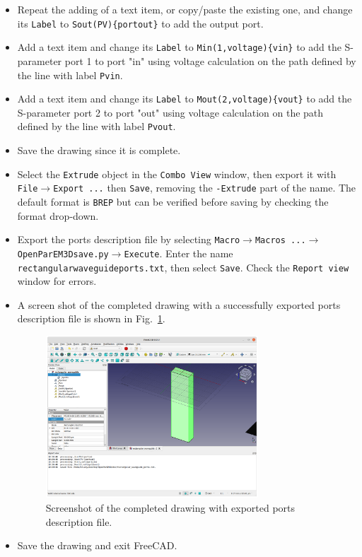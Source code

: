\documentclass[titlepage]{article}
\renewcommand\_{\textunderscore\linebreak[1]}
\begin{document}
\begin{itemize}
\item Repeat the adding of a text item, or copy/paste the existing one, and change its \texttt{Label} to \newline \texttt{\_Sout(PV)\{portout\}} to add the output port.
\item Add a text item and change its \texttt{Label} to \texttt{\_Min(1,voltage)\{vin\}} to add the S-parameter port 1 to port "in" using voltage calculation on the path defined by the line with label \texttt{\_Pvin}.
\item Add a text item and change its \texttt{Label} to \texttt{\_Mout(2,voltage)\{vout\}} to add the S-parameter port 2 to port "out" using voltage calculation on the path defined by the line with label \texttt{\_Pvout}.
\item Save the drawing since it is complete.
\item Select the \texttt{Extrude} object in the \texttt{Combo View} window, then export it with \texttt{File}$\rightarrow$\texttt{Export ...} then \texttt{Save}, removing the \verb+-Extrude+ part of the name.  The default format is \texttt{BREP} but can be verified before saving by checking the format drop-down.
\item Export the ports description file by selecting \texttt{Macro}$\rightarrow$\texttt{Macros ...}$\rightarrow$\texttt{OpenParEM3D\_save.py}$\rightarrow$\texttt{Execute}.  Enter the name \texttt{rectangular\_waveguide\_ports.txt}, then select \texttt{Save}.  Check the \texttt{Report view} window for errors.
\item A screen shot of the completed drawing with a successfully exported ports description file is shown in Fig.~\ref{fig:drawing_finished}.
\begin{figure}
  \centering
  \includegraphics[width=0.75\textwidth]{../tutorials/OpenParEM3D/rectangular_waveguide/screenshots/drawing_finished}
  \caption{Screenshot of the completed drawing with exported ports description file.}
  \label{fig:drawing_finished}
\end{figure}
\item Save the drawing and exit FreeCAD.

\end{itemize}
\end{document}
